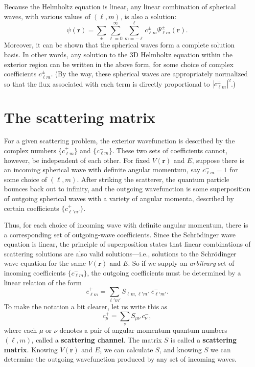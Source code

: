 \documentclass[pra,12pt]{revtex4}
\begin{document}
Because the Helmholtz equation is linear, any linear combination of
spherical waves, with various values of $(\ell,m)$, is also a solution:
$$\psi(\mathbf{r}) = \sum_\pm \sum_{\ell = 0}^\infty \sum_{m = - \ell}^\ell c_{\ell m}^\pm \Psi_{\ell m}^\pm(\mathbf{r}).$$
Moreover, it can be shown that the spherical waves form a complete
solution basis.  In other words, any solution to the 3D Helmholtz
equation within the exterior region can be written in the above form,
for some choice of complex coefficients $c_{\ell m}^\pm$.  (By the way,
these spherical waves are appropriately normalized so that the flux
associated with each term is directly proportional to $|c_{\ell
  m}^\pm|^2$.)

\section{The scattering matrix}

For a given scattering problem, the exterior wavefunction is described
by the complex numbers $\{c_{\ell m}^+\}$ and $\{c_{\ell m}^-\}$.
These two sets of coefficients cannot, however, be independent of each
other.  For fixed $V(\mathbf{r})$ and $E$, suppose there is an
incoming spherical wave with definite angular momentum, say $c_{\ell
  m}^- = 1$ for some choice of $(\ell,m)$.  After striking the
scatterer, the quantum particle bounces back out to infinity, and the
outgoing wavefunction is some superposition of outgoing spherical
waves with a variety of angular momenta, described by certain
coefficients $\{c_{\ell' m'}^+\}$.

Thus, for each choice of incoming wave with definite angular momentum,
there is a corresponding set of outgoing-wave coefficients.  Since the
Schr\"odinger wave equation is linear, the principle of superposition
states that linear combinations of scattering solutions are also valid
solutions---i.e., solutions to the Schr\"odinger wave equation for the
same $V(\mathbf{r})$ and $E$.  So if we supply an \textit{arbitrary}
set of incoming coefficients $\{c_{\ell m}^-\}$, the outgoing
coefficients must be determined by a linear relation of the form
$$c_{\ell m}^+ = \sum_{\ell'm'} S_{\ell m, \ell' m'} \;c_{\ell' m'}^-.$$
To make the notation a bit clearer, let us write this as
$$c_{\mu}^+ = \sum_{\nu} S_{\mu \nu} \, c_{\nu}^-,$$
where each $\mu$ or $\nu$ denotes a pair of angular momentum quantum
numbers $(\ell,m)$, called a \textbf{scattering channel}.  The matrix
$S$ is called a \textbf{scattering matrix}.  Knowing $V(\mathbf{r})$
and $E$, we can calculate $S$, and knowing $S$ we can determine the
outgoing wavefunction produced by any set of incoming waves.
\end{document}
